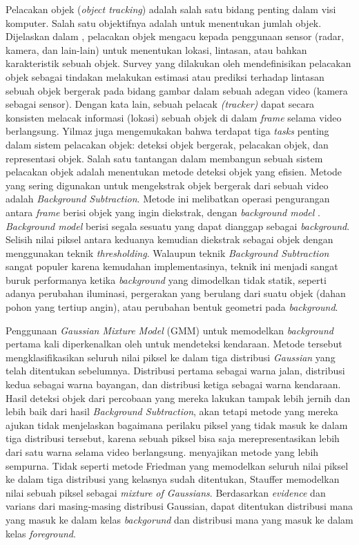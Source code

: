     Pelacakan objek (\textit{object tracking}) adalah salah satu bidang penting dalam visi komputer. Salah satu objektifnya adalah untuk menentukan jumlah objek. Dijelaskan dalam \citep{Challa2011}, pelacakan objek mengacu kepada penggunaan sensor (radar, kamera, dan lain-lain) untuk menentukan lokasi, lintasan, atau bahkan karakteristik sebuah objek. Survey yang dilakukan oleh \citep*{Yilmaz2006} mendefinisikan pelacakan objek sebagai tindakan melakukan estimasi atau prediksi terhadap lintasan sebuah objek bergerak pada bidang gambar dalam sebuah adegan video (kamera sebagai sensor). Dengan kata lain, sebuah pelacak \textit{(tracker)} dapat secara konsisten melacak informasi (lokasi) sebuah objek di dalam \textit{frame} selama video berlangsung. Yilmaz juga mengemukakan bahwa terdapat tiga \textit{tasks} penting dalam sistem pelacakan objek: deteksi objek bergerak, pelacakan objek, dan representasi objek. Salah satu tantangan dalam membangun sebuah sistem pelacakan objek adalah menentukan metode deteksi objek yang efisien. Metode yang sering digunakan untuk mengekstrak objek bergerak dari sebuah video adalah \emph{Background Subtraction}. Metode ini melibatkan operasi pengurangan antara \textit{frame} berisi objek yang ingin diekstrak, dengan \emph{background model} \citep{Saravanakumar2010}. \emph{Background model} berisi segala sesuatu yang dapat dianggap sebagai \emph{background}.  Selisih nilai piksel antara keduanya kemudian diekstrak sebagai objek dengan menggunakan teknik \emph{thresholding}. Walaupun teknik \emph{Background Subtraction} sangat populer karena kemudahan implementasinya, teknik ini menjadi sangat buruk performanya ketika \emph{background} yang dimodelkan tidak statik, seperti adanya perubahan iluminasi, pergerakan yang berulang dari suatu objek (dahan pohon yang tertiup angin), atau perubahan bentuk geometri pada \emph{background}.
    
    Penggunaan \textit{Gaussian Mixture Model} (GMM) untuk memodelkan \textit{background} pertama kali diperkenalkan oleh \citet{Friedman1997} untuk mendeteksi kendaraan. Metode tersebut mengklasifikasikan seluruh nilai piksel ke dalam tiga distribusi \textit{Gaussian} yang telah ditentukan sebelumnya. Distribusi pertama sebagai warna jalan, distribusi kedua sebagai warna bayangan, dan distribusi ketiga sebagai warna kendaraan. Hasil deteksi objek dari percobaan yang mereka lakukan tampak lebih jernih dan lebih baik dari hasil \textit{Background Subtraction}, akan tetapi metode yang mereka ajukan tidak menjelaskan bagaimana perilaku piksel yang tidak masuk ke dalam tiga distribusi tersebut, karena sebuah piksel bisa saja merepresentasikan lebih dari satu warna selama video berlangsung. \citet{Stauffer1999} menyajikan metode yang lebih sempurna. Tidak seperti metode Friedman yang memodelkan seluruh nilai piksel ke dalam tiga distribusi yang kelasnya sudah ditentukan, Stauffer memodelkan nilai sebuah piksel sebagai \textit{mixture of Gaussians}. Berdasarkan \textit{evidence} dan varians dari masing-masing distribusi Gaussian, dapat ditentukan distribusi mana yang masuk ke dalam kelas \textit{backgorund} dan distribusi mana yang masuk ke dalam kelas \textit{foreground}.
    
